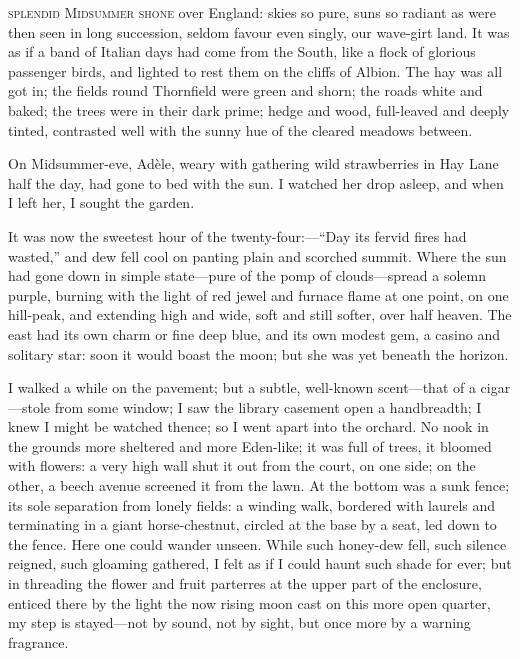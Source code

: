 
 \textsc{splendid Midsummer shone} over England: skies so pure, suns so radiant
as were then seen in long succession, seldom favour even singly, our
wave-girt land. It was as if a band of Italian days had come from the
South, like a flock of glorious passenger birds, and lighted to rest
them on the cliffs of Albion. The hay was all got in; the fields round
Thornfield were green and shorn; the roads white and baked; the trees
were in their dark prime; hedge and wood, full-leaved and deeply tinted,
contrasted well with the sunny hue of the cleared meadows between.

On Midsummer-eve, Adèle, weary with gathering wild strawberries in Hay
Lane half the day, had gone to bed with the sun. I watched her drop
asleep, and when I left her, I sought the garden.

It was now the sweetest hour of the twenty-four:---\enquote{Day its
	fervid fires had wasted,} and dew fell cool on panting plain and
scorched summit. Where the sun had gone down in simple state---pure of
the pomp of clouds---spread a solemn purple, burning with the light of
red jewel and furnace flame at one point, on one hill-peak, and
extending high and wide, soft and still softer, over half heaven. The
east had its own charm or fine deep blue, and its own modest gem, a
casino and solitary star: soon it would boast the moon; but she was yet
beneath the horizon.

I walked a while on the pavement; but a subtle, well-known scent---that
of a cigar---stole from some window; I saw the library casement open a
handbreadth; I knew I might be watched thence; so I went apart into the
orchard. No nook in the grounds more sheltered and more Eden-like; it
was full of trees, it bloomed with flowers: a very high wall shut it out
from the court, on one side; on the other, a beech avenue screened it
from the lawn. At the bottom was a sunk fence; its sole separation from
lonely fields: a winding walk, bordered with laurels and terminating in
a giant horse-chestnut, circled at the base by a seat, led down to the
fence. Here one could wander unseen. While such honey-dew fell, such
silence reigned, such gloaming gathered, I felt as if I could haunt such
shade for ever; but in threading the flower and fruit parterres at the
upper part of the enclosure, enticed there by the light the now rising
moon cast on this more open quarter, my step is stayed---not by sound,
not by sight, but once more by a warning fragrance.

